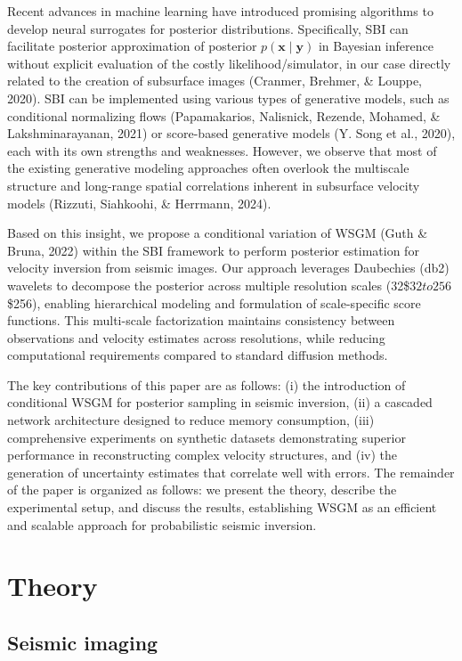 \documentclass{IMAGE2025}
\begin{document}
Recent advances in machine learning have introduced promising algorithms
to develop neural surrogates for posterior distributions. Specifically,
SBI can facilitate posterior approximation of posterior
\(p(\mathbf{x} \mid \mathbf{y})\) in Bayesian inference without explicit
evaluation of the costly likelihood/simulator, in our case directly
related to the creation of subsurface images (Cranmer, Brehmer, \&
Louppe, 2020). SBI can be implemented using various types of generative
models, such as conditional normalizing flows (Papamakarios, Nalisnick,
Rezende, Mohamed, \& Lakshminarayanan, 2021) or score-based generative
models (Y. Song et al., 2020), each with its own strengths and
weaknesses. However, we observe that most of the existing generative
modeling approaches often overlook the multiscale structure and
long-range spatial correlations inherent in subsurface velocity models
(Rizzuti, Siahkoohi, \& Herrmann, 2024).

Based on this insight, we propose a conditional variation of WSGM (Guth
\& Bruna, 2022) within the SBI framework to perform posterior estimation
for velocity inversion from seismic images. Our approach leverages
Daubechies (db2) wavelets to decompose the posterior across multiple
resolution scales (32\$\times\(32 to 256\)\times\$256), enabling
hierarchical modeling and formulation of scale-specific score functions.
This multi-scale factorization maintains consistency between
observations and velocity estimates across resolutions, while reducing
computational requirements compared to standard diffusion methods.

The key contributions of this paper are as follows: (i) the introduction
of conditional WSGM for posterior sampling in seismic inversion, (ii) a
cascaded network architecture designed to reduce memory consumption,
(iii) comprehensive experiments on synthetic datasets demonstrating
superior performance in reconstructing complex velocity structures, and
(iv) the generation of uncertainty estimates that correlate well with
errors. The remainder of the paper is organized as follows: we present
the theory, describe the experimental setup, and discuss the results,
establishing WSGM as an efficient and scalable approach for
probabilistic seismic inversion.

\section{Theory}\label{theory}

\subsection{Seismic imaging}\label{seismic-imaging}
\end{document}
